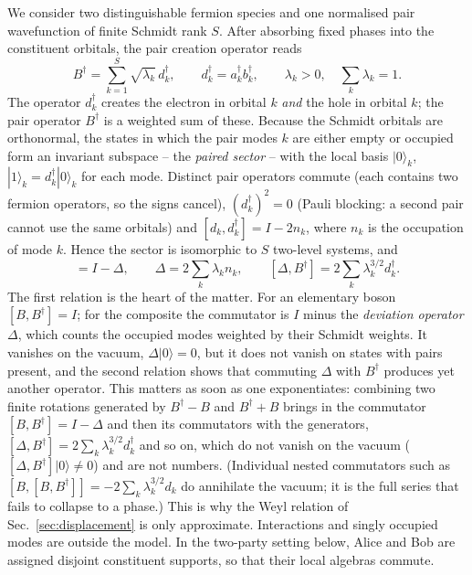 \documentclass[11pt,a4paper]{article}
\newcommand{\ket}[1]{|#1\rangle}
\begin{document}
We consider two distinguishable fermion species and one normalised pair wavefunction of finite Schmidt rank $S$. After absorbing fixed phases into the constituent orbitals, the pair creation operator reads
\begin{equation}
B^\dagger=\sum_{k=1}^{S}\sqrt{\lambda_k}\,d_k^\dagger,\qquad d_k^\dagger=a_k^\dagger b_k^\dagger,\qquad \lambda_k>0,\quad \sum_k\lambda_k=1.
\label{eq:B}
\end{equation}
The operator $d_k^\dagger$ creates the electron in orbital $k$ \emph{and} the hole in orbital $k$; the pair operator $B^\dagger$ is a weighted sum of these. Because the Schmidt orbitals are orthonormal, the states in which the pair modes $k$ are either empty or occupied form an invariant subspace -- the \emph{paired sector} -- with the local basis $\ket{0}_k$, $\ket{1}_k=d_k^\dagger\ket{0}_k$ for each mode. Distinct pair operators commute (each contains two fermion operators, so the signs cancel), $(d_k^\dagger)^2=0$ (Pauli blocking: a second pair cannot use the same orbitals) and $[d_k,d_k^\dagger]=I-2n_k$, where $n_k$ is the occupation of mode $k$. Hence the sector is isomorphic to $S$ two-level systems, and
\begin{equation}
[B,B^\dagger]=I-\Delta,\qquad \Delta=2\sum_k\lambda_k n_k,\qquad [\Delta,B^\dagger]=2\sum_k\lambda_k^{3/2}d_k^\dagger .
\label{eq:comm}
\end{equation}
The first relation is the heart of the matter. For an elementary boson $[B,B^\dagger]=I$; for the composite the commutator is $I$ minus the \emph{deviation operator} $\Delta$, which counts the occupied modes weighted by their Schmidt weights. It vanishes on the vacuum, $\Delta\ket0=0$, but it does not vanish on states with pairs present, and the second relation shows that commuting $\Delta$ with $B^\dagger$ produces yet another operator. This matters as soon as one exponentiates: combining two finite rotations generated by $B^\dagger-B$ and $B^\dagger+B$ brings in the commutator $[B,B^\dagger]=I-\Delta$ and then its commutators with the generators, $[\Delta,B^\dagger]=2\sum_k\lambda_k^{3/2}d_k^\dagger$ and so on, which do not vanish on the vacuum ($[\Delta,B^\dagger]\ket0\neq0$) and are not numbers. (Individual nested commutators such as $[B,[B,B^\dagger]]=-2\sum_k\lambda_k^{3/2}d_k$ do annihilate the vacuum; it is the full series that fails to collapse to a phase.) This is why the Weyl relation of Sec.~\ref{sec:displacement} is only approximate. Interactions and singly occupied modes are outside the model. In the two-party setting below, Alice and Bob are assigned disjoint constituent supports, so that their local algebras commute.
\end{document}
